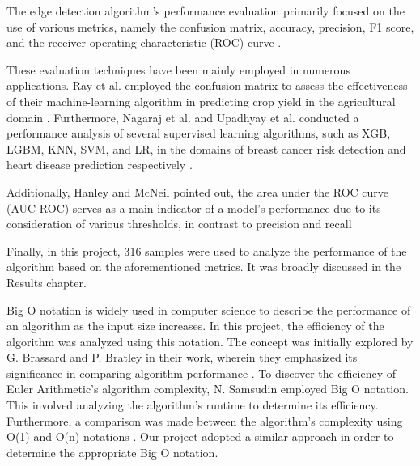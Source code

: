 \documentclass[]{iat}
\begin{document}
\par
The edge detection algorithm’s performance evaluation primarily focused on the use of various metrics, namely the confusion matrix, accuracy, precision, F1 score, and the receiver operating characteristic (ROC) curve \cite{powers2011evaluation}.
\par
These evaluation techniques have been mainly employed in numerous applications. Ray et al. employed the confusion matrix to assess the effectiveness of their machine-learning algorithm in predicting crop yield in the agricultural domain \cite{9734173}. Furthermore, Nagaraj et al. and Upadhyay et al. conducted a performance analysis of several supervised learning algorithms, such as XGB, LGBM, KNN, SVM, and LR, in the domains of breast cancer risk detection and heart disease prediction respectively \cite{10080076, 9537093}.
\par
Additionally, Hanley and McNeil pointed out, the area under the ROC curve (AUC-ROC) serves as a main indicator of a model's performance due to its consideration of various thresholds, in contrast to precision and recall \cite{doi:10.1148/radiology.143.1.7063747}
\par
Finally, in this project, 316 samples were used to analyze the performance of the algorithm based on the aforementioned metrics. It was broadly discussed in the Results chapter.
\par
Big O notation is widely used in computer science to describe the performance of an algorithm as the input size increases. In this project, the efficiency of the algorithm was analyzed using this notation. The concept was initially explored by G. Brassard and P. Bratley in their work, wherein they emphasized its significance in comparing algorithm performance \cite{brassard1996fundamentals}. To discover the efficiency of Euler Arithmetic's algorithm complexity, N. Samsudin employed Big O notation. This involved analyzing the algorithm's runtime to determine its efficiency. Furthermore, a comparison was made between the algorithm's complexity using O(1) and O(n) notations \cite{Samsudin2020}. Our project adopted a similar approach in order to determine the appropriate Big O notation.
\par
\end{document}
